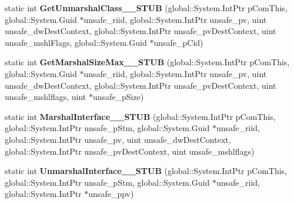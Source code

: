 \begin{DoxyCompactItemize}
static int {\bfseries Get\+Unmarshal\+Class\+\_\+\+\_\+\+S\+T\+UB} (global\+::\+System.\+Int\+Ptr p\+Com\+This, global\+::\+System.\+Guid $\ast$unsafe\+\_\+riid, global\+::\+System.\+Int\+Ptr unsafe\+\_\+pv, uint unsafe\+\_\+dw\+Dest\+Context, global\+::\+System.\+Int\+Ptr unsafe\+\_\+pv\+Dest\+Context, uint unsafe\+\_\+mshl\+Flags, global\+::\+System.\+Guid $\ast$unsafe\+\_\+p\+Cid)
\item 
\mbox{\label{struct_system_1_1_runtime_1_1_interop_services_1_1_i_marshal_____system___runtime___windows_runtime_____impl_1_1_vtbl_ae262511ad2d922da2fa5f9b7b21f17fa}} 
static int {\bfseries Get\+Marshal\+Size\+Max\+\_\+\+\_\+\+S\+T\+UB} (global\+::\+System.\+Int\+Ptr p\+Com\+This, global\+::\+System.\+Guid $\ast$unsafe\+\_\+riid, global\+::\+System.\+Int\+Ptr unsafe\+\_\+pv, uint unsafe\+\_\+dw\+Dest\+Context, global\+::\+System.\+Int\+Ptr unsafe\+\_\+pv\+Dest\+Context, uint unsafe\+\_\+mshlflags, uint $\ast$unsafe\+\_\+p\+Size)
\item 
\mbox{\label{struct_system_1_1_runtime_1_1_interop_services_1_1_i_marshal_____system___runtime___windows_runtime_____impl_1_1_vtbl_a8ca757bdde9525e1da4e2ba60a35ffd6}} 
static int {\bfseries Marshal\+Interface\+\_\+\+\_\+\+S\+T\+UB} (global\+::\+System.\+Int\+Ptr p\+Com\+This, global\+::\+System.\+Int\+Ptr unsafe\+\_\+p\+Stm, global\+::\+System.\+Guid $\ast$unsafe\+\_\+riid, global\+::\+System.\+Int\+Ptr unsafe\+\_\+pv, uint unsafe\+\_\+dw\+Dest\+Context, global\+::\+System.\+Int\+Ptr unsafe\+\_\+pv\+Dest\+Context, uint unsafe\+\_\+mshlflags)
\item 
\mbox{\label{struct_system_1_1_runtime_1_1_interop_services_1_1_i_marshal_____system___runtime___windows_runtime_____impl_1_1_vtbl_a6325016e621765b68878de65e7fe333e}} 
static int {\bfseries Unmarshal\+Interface\+\_\+\+\_\+\+S\+T\+UB} (global\+::\+System.\+Int\+Ptr p\+Com\+This, global\+::\+System.\+Int\+Ptr unsafe\+\_\+p\+Stm, global\+::\+System.\+Guid $\ast$unsafe\+\_\+riid, global\+::\+System.\+Int\+Ptr $\ast$unsafe\+\_\+ppv)
\item 
\mbox{\label{struct_system_1_1_runtime_1_1_interop_services_1_1_i_marshal_____system___runtime___windows_runtime_____impl_1_1_vtbl_acb4ef2d5853f6ed1823d32c7939a9c80}} 

\end{DoxyCompactItemize}
